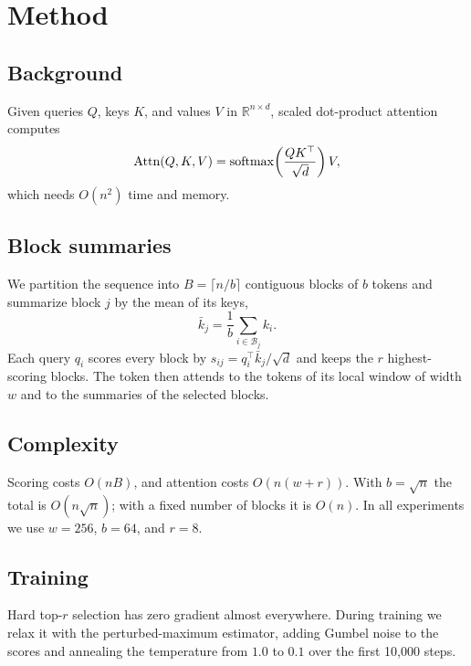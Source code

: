 \section{Method}
\label{sec:method}

\subsection{Background}

Given queries $Q$, keys $K$, and values $V$ in $\mathbb{R}^{n \times d}$, scaled dot-product attention computes
\begin{equation}
  \operatorname{Attn}(Q, K, V) = \operatorname{softmax}\!\left( \frac{Q K^\top}{\sqrt{d}} \right) V ,
  \label{eq:attention}
\end{equation}
which needs $O(n^2)$ time and memory.

\subsection{Block summaries}

We partition the sequence into $B = \lceil n / b \rceil$ contiguous blocks of $b$ tokens and summarize block $j$ by the mean of its keys,
\begin{equation}
  \bar{k}_j = \frac{1}{b} \sum_{i \in \mathcal{B}_j} k_i .
\end{equation}
Each query $q_i$ scores every block by $s_{ij} = q_i^\top \bar{k}_j / \sqrt{d}$ and keeps the $r$ highest-scoring blocks. The token then attends to the tokens of its local window of width $w$ and to the summaries of the selected blocks.

\subsection{Complexity}

Scoring costs $O(nB)$, and attention costs $O(n(w + r))$. With $b = \sqrt{n}$ the total is $O(n\sqrt{n})$; with a fixed number of blocks it is $O(n)$. In all experiments we use $w = 256$, $b = 64$, and $r = 8$.

\subsection{Training}

Hard top-$r$ selection has zero gradient almost everywhere. During training we relax it with the perturbed-maximum estimator, adding Gumbel noise to the scores and annealing the temperature from $1.0$ to $0.1$ over the first 10{,}000 steps.
